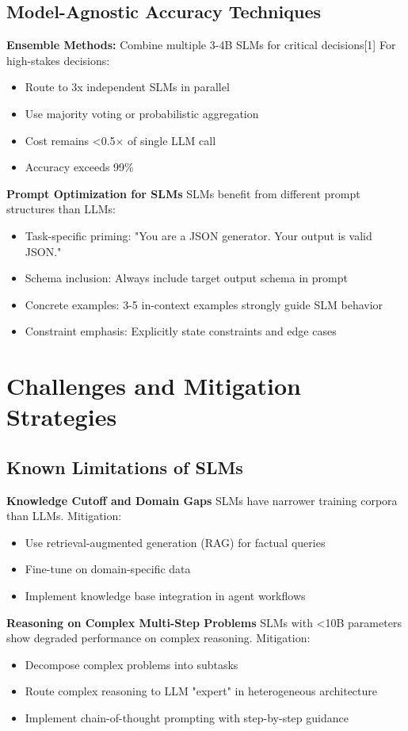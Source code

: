 \documentclass[11pt,a4paper]{article}
\begin{document}
\subsection{Model-Agnostic Accuracy Techniques}
\textbf{Ensemble Methods:} Combine multiple 3-4B SLMs for critical decisions[1]
For high-stakes decisions:
\begin{itemize}
    \item Route to 3x independent SLMs in parallel
    \item Use majority voting or probabilistic aggregation
    \item Cost remains <0.5$\times$ of single LLM call
    \item Accuracy exceeds 99\%
\end{itemize}
\textbf{Prompt Optimization for SLMs} \cite{nvidia2025}
SLMs benefit from different prompt structures than LLMs:
\begin{itemize}
\item Task-specific priming: "You are a JSON generator. Your output is valid JSON."
\item Schema inclusion: Always include target output schema in prompt
\item Concrete examples: 3-5 in-context examples strongly guide SLM behavior
\item Constraint emphasis: Explicitly state constraints and edge cases
\end{itemize}



\section{Challenges and Mitigation Strategies}
\subsection{Known Limitations of SLMs}
\textbf{Knowledge Cutoff and Domain Gaps} \cite{belcak2025}
SLMs have narrower training corpora than LLMs. Mitigation:
\begin{itemize}
    \item Use retrieval-augmented generation (RAG) for factual queries
    \item Fine-tune on domain-specific data
    \item Implement knowledge base integration in agent workflows
\end{itemize}

\textbf{Reasoning on Complex Multi-Step Problems} \cite{belcak2025}
SLMs with <10B parameters show degraded performance on complex reasoning. Mitigation:
\begin{itemize}
    \item Decompose complex problems into subtasks
    \item Route complex reasoning to LLM "expert" in heterogeneous architecture
    \item Implement chain-of-thought prompting with step-by-step guidance
\end{itemize}
\end{document}
